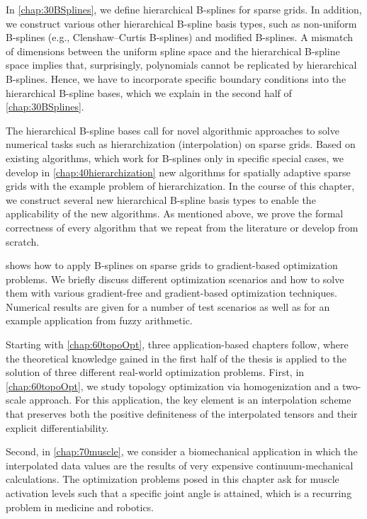 In \cref{chap:30BSplines}, we define hierarchical B-splines for sparse grids.
In addition, we construct various other hierarchical
B-spline basis types, such as
non-uniform B-splines (e.g., Clenshaw--Curtis B-splines) and
modified B-splines.
A mismatch of dimensions between the uniform spline space and the
hierarchical B-spline space implies that, surprisingly,
polynomials cannot be replicated by hierarchical B-splines.
Hence, we have to incorporate specific boundary conditions
 into the hierarchical B-spline bases,
which we explain in the second half of \cref{chap:30BSplines}.

The hierarchical B-spline bases call for novel algorithmic approaches
to solve numerical tasks such as
hierarchization (interpolation) on sparse grids.
Based on existing algorithms,
which work for B-splines only in specific special cases,
we develop in \cref{chap:40hierarchization} new algorithms for
spatially adaptive sparse grids with the example problem of hierarchization.
In the course of this chapter, we construct several new
hierarchical B-spline basis types to enable the
applicability of the new algorithms.
As mentioned above, we prove the formal correctness of every algorithm
that we repeat from the literature or develop from scratch.

 shows how to apply B-splines on sparse grids
to gradient-based optimization problems.
We briefly discuss different optimization scenarios and how to solve them
with various gradient-free and gradient-based optimization techniques.
Numerical results are given for a number of test scenarios as well
as for an example application from fuzzy arithmetic.

Starting with \cref{chap:60topoOpt}, three application-based chapters follow,
where the theoretical knowledge gained in the first half of the thesis
is applied to the solution of three different real-world optimization problems.
%
First, in \cref{chap:60topoOpt},
we study topology optimization via homogenization
and a two-scale approach.
For this application, the key element is an interpolation scheme
that preserves both the positive definiteness of the interpolated tensors and
their explicit differentiability.

Second, in \cref{chap:70muscle},
we consider a biomechanical application in which the interpolated data values
are the results of very expensive continuum-mechanical calculations.
The optimization problems posed in this chapter ask for
muscle activation levels such that a specific joint angle is attained,
which is a recurring problem in medicine and robotics.

